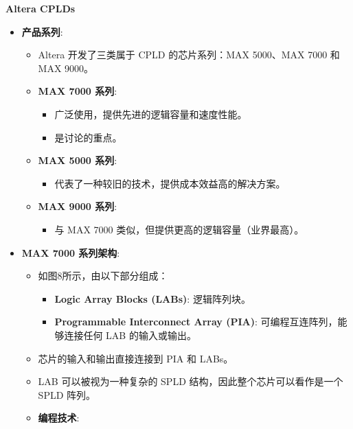\documentclass[
  ignorenonframetext,
  chinese,
]{beamer}
\providecommand{\tightlist}{%
  \setlength{\itemsep}{0pt}\setlength{\parskip}{0pt}}
\begin{document}
\begin{frame}
\begin{block}{\textbf{Altera CPLDs}}
\label{altera-cplds}
\begin{itemize}
\item
  \textbf{产品系列}:

  \begin{itemize}
  \tightlist
  \item
    Altera 开发了三类属于 CPLD 的芯片系列：MAX 5000、MAX 7000 和 MAX
    9000。
  \item
    \textbf{MAX 7000 系列}:

    \begin{itemize}
    \tightlist
    \item
      广泛使用，提供先进的逻辑容量和速度性能。
    \item
      是讨论的重点。
    \end{itemize}
  \item
    \textbf{MAX 5000 系列}:

    \begin{itemize}
    \tightlist
    \item
      代表了一种较旧的技术，提供成本效益高的解决方案。
    \end{itemize}
  \item
    \textbf{MAX 9000 系列}:

    \begin{itemize}
    \tightlist
    \item
      与 MAX 7000 类似，但提供更高的逻辑容量（业界最高）。
    \end{itemize}
  \end{itemize}
\item
  \textbf{MAX 7000 系列架构}:

  \begin{itemize}
  \tightlist
  \item
    如图8所示，由以下部分组成：

    \begin{itemize}
    \tightlist
    \item
      \textbf{Logic Array Blocks (LABs)}: 逻辑阵列块。
    \item
      \textbf{Programmable Interconnect Array (PIA)}:
      可编程互连阵列，能够连接任何 LAB 的输入或输出。
    \end{itemize}
  \item
    芯片的输入和输出直接连接到 PIA 和 LABs。
  \item
    LAB 可以被视为一种复杂的 SPLD 结构，因此整个芯片可以看作是一个 SPLD
    阵列。
  \item
    \textbf{编程技术}:


\end{itemize}
\end{itemize}
\end{block}
\end{frame}
\end{document}
